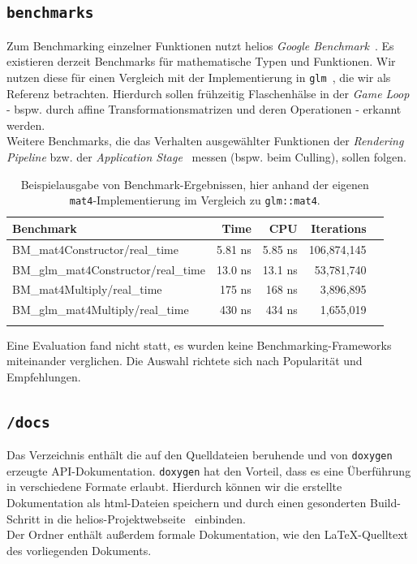 \subsection*{\texttt{benchmarks}}
\noindent
Zum Benchmarking einzelner Funktionen nutzt helios \textit{Google Benchmark}~\cite[]{googlebenchmarkgithub}.
Es existieren derzeit Benchmarks für mathematische Typen und Funktionen.
Wir nutzen diese für einen Vergleich mit der Implementierung in \texttt{glm}~\cite[]{glmGithub}, die wir als Referenz betrachten.
Hierdurch sollen frühzeitig Flaschenhälse in der \textit{Game Loop} - bspw.  durch affine Transformationsmatrizen und deren Operationen - erkannt werden.\\
Weitere Benchmarks, die das Verhalten ausgewählter Funktionen der \textit{Rendering Pipeline} bzw. der \textit{Application Stage}~\cite[687]{Gre19} messen (bspw. beim Culling), sollen folgen.
\begin{table}[h!]
    \centering
    \begin{tabular}{lrrrr}
        \hline
        \textbf{Benchmark} & \textbf{Time} & \textbf{CPU} & \textbf{Iterations} \\
        \hline
        BM\_mat4Constructor/real\_time         & 5.81 ns  & 5.85 ns  & 106{,}874{,}145 \\
        BM\_glm\_mat4Constructor/real\_time    & 13.0 ns  & 13.1 ns  & 53{,}781{,}740 \\
        BM\_mat4Multiply/real\_time            & 175 ns   & 168 ns   & 3{,}896{,}895 \\
        BM\_glm\_mat4Multiply/real\_time       & 430 ns   & 434 ns   & 1{,}655{,}019 \\
        \hline\\
    \end{tabular}
    \label{tab:mat4-benchmark}
    \caption{Beispielausgabe von Benchmark-Ergebnissen, hier anhand der eigenen \texttt{mat4}-Implementierung im Vergleich zu \texttt{glm::mat4}.}
\end{table}

\noindent
Eine Evaluation fand nicht statt, es wurden keine Benchmarking-Frameworks miteinander verglichen.
Die Auswahl richtete sich nach Popularität und Empfehlungen.

\subsection*{\texttt{/docs}}
\noindent
Das Verzeichnis enthält die auf den Quelldateien beruhende und von \texttt{doxygen}~\cite[]{Doxygen} erzeugte API-Dokumentation.
\texttt{doxygen} hat den Vorteil, dass es eine Überführung in verschiedene Formate erlaubt. Hierdurch können wir die erstellte Dokumentation als html-Dateien speichern und durch einen gesonderten Build-Schritt in die helios-Projektwebseite~\cite[]{helios} einbinden.\\
Der Ordner enthält außerdem formale Dokumentation, wie den \LaTeX-Quelltext des vorliegenden Dokuments.

